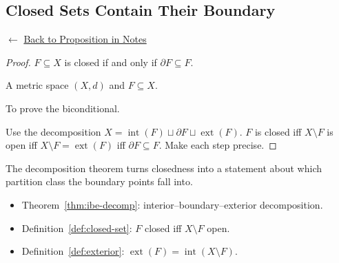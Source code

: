 
\subsection*{Closed Sets Contain Their Boundary}
\label{prf:closed-owns-boundary}

\begin{remark*}[Return]
$\leftarrow$ \hyperref[prop:closed-owns-boundary]{Back to Proposition in Notes}
\end{remark*}

\begin{proof}
\Claim $F \subseteq X$ is closed if and only if $\partial F \subseteq F$.

\Given A metric space $(X,d)$ and $F \subseteq X$.

\Goal To prove the biconditional.

\Strategy Use the decomposition $X = \operatorname{int}(F) \sqcup \partial F \sqcup \operatorname{ext}(F)$.
$F$ is closed iff $X \setminus F$ is open iff $X \setminus F = \operatorname{ext}(F)$
iff $\partial F \subseteq F$.
Make each step precise.


\end{proof}

\begin{remark*}
The decomposition theorem turns closedness into a statement about
which partition class the boundary points fall into.
\end{remark*}

\begin{remark*}[Dependencies]
\begin{itemize}
  \item Theorem~\ref{thm:ibe-decomp}: interior--boundary--exterior decomposition.
  \item Definition~\ref{def:closed-set}: $F$ closed iff $X \setminus F$ open.
  \item Definition~\ref{def:exterior}: $\operatorname{ext}(F) = \operatorname{int}(X \setminus F)$.
\end{itemize}
\end{remark*}
